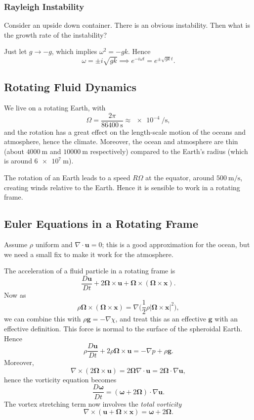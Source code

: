 \documentclass[12pt]{article}
\begin{document}
\subsubsection{Rayleigh Instability}
\label{subsub:rayleigh_instability}

Consider an upside down container. There is an obvious instability. Then what is the growth rate of the instability?

Just let $g \to -g$, which implies $\omega^2 = - gk$. Hence
\[
	\omega = \pm i \sqrt{gk} \implies e^{-i \omega t} = e^{\pm \sqrt{gk} t}.
\]

\subsection{Rotating Fluid Dynamics}
\label{sub:rotating_fluid_dynamics}

We live on a rotating Earth, with
\[
	\Omega = \frac{2\pi}{\qty{86400}{\second}} \approx \qty{e-4}{\per \second},
\]
and the rotation has a great effect on the length-scale motion of the oceans and atmosphere, hence the climate. Moreover, the ocean and atmosphere are thin (about $\qty{4000}{\metre}$ and $\qty{10000}{\metre}$ respectively) compared to the Earth's radius (which is around $\qty{6e7}{\metre}$).

The rotation of an Earth leads to a speed $R \Omega$ at the equator, around $\qty{500}{\metre \per \second}$, creating winds relative to the Earth. Hence it is sensible to work in a rotating frame. 

\subsection{Euler Equations in a Rotating Frame}
\label{sub:euler_equations_in_a_rotating_frame}

Assume $\rho$ uniform and $\nabla \cdot \mathbf{u} = 0$; this is a good approximation for the ocean, but we need a small fix to make it work for the atmosphere.

The acceleration of a fluid particle in a rotating frame is
\[
\frac{D \mathbf{u}}{D t} + 2 \bm{\Omega} \times \mathbf{u} + \bm{\Omega} \times (\bm{\Omega} \times \mathbf{x}).
\]
Now as
\[
\rho \bm{\Omega} \times (\bm{\Omega} \times \mathbf{x}) = \nabla \biggl( \frac{1}{2} \rho |\bm{\Omega} \times \mathbf{x}|^2 \biggr),
\]
we can combine this with $\rho \mathbf{g} = - \nabla \chi$, and treat this as an effective $\mathbf{g}$ with an effective definition. This force is normal to the surface of the spheroidal Earth. Hence
\[
	\rho \frac{D \mathbf{u}}{D t} + 2 \rho \bm{\Omega} \times \mathbf{u} = - \nabla p + \rho \mathbf{g}.
\]
Moreover,
\[
\nabla \times (2 \bm{\Omega} \times \mathbf{u}) = 2 \bm{\Omega} \nabla \cdot \mathbf{u} = 2 \bm{\Omega} \cdot \nabla \mathbf{u},
\]
hence the vorticity equation becomes
\[
\frac{D \bm{\omega}}{D t} = (\bm{\omega} + 2 \bm{\Omega}) \cdot \nabla \mathbf{u}.
\]
The vortex stretching term now involves the \emph{total vorticity}
\[
\nabla \times (\mathbf{u} + \bm{\Omega} \times \mathbf{x}) = \bm{\omega} + 2 \bm{\Omega}.
\]
\end{document}
